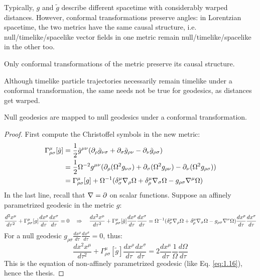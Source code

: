 Typically, $ g $ and $ \tilde{g} $ describe different spacetime with considerably warped distances. However, conformal transformations preserve angles: in Lorentzian spacetime, the two metrics have the same causal structure, i.e. null/timelike/spacelike vector fields in one metric remain null/timelike/spacelike in the other too.

\begin{proposition}
  Only conformal transformations of the metric preserve its causal structure.
\end{proposition}

Although timelike particle trajectories necessarily remain timelike under a conformal transformation, the same needs not be true for geodesics, as distances get warped.

\begin{proposition}
  Null geodesics are mapped to null geodesics under a conformal transformation.
\end{proposition}
\begin{proof}
  First compute the Christoffel symbols in the new metric:
  \begin{equation*}
    \begin{split}
      \Gamma^\mu_{\rho \sigma}[\tilde{g}]
      &= \frac{1}{2} \tilde{g}^{\mu \nu} (\partial_\rho \tilde{g}_{\nu \sigma} + \partial_\sigma \tilde{g}_{\rho \nu} - \partial_\nu \tilde{g}_{\rho \sigma}) \\
      &= \frac{1}{2} \Omega^{-2} g^{\mu \nu} (\partial_\rho (\Omega^2 g_{\nu \sigma}) + \partial_\sigma (\Omega^2 g_{\rho \nu}) - \partial_\nu (\Omega^2 g_{\rho \sigma})) \\
      &= \Gamma^\mu_{\rho \sigma}[g] + \Omega^{-1} (\delta^\mu_\sigma \nabla_\rho \Omega + \delta^\mu_\rho \nabla_\sigma \Omega - g_{\rho \sigma} \nabla^\mu \Omega)
    \end{split}
  \end{equation*}
  In the last line, recall that $ \nabla = \partial $ on scalar functions. Suppose an affinely parametrized geodesic in the metric $ g $:
  \begin{equation*}
    \frac{d^2 x^\mu}{d\tau^2} + \Gamma^\mu_{\rho \sigma}[g] \frac{dx^\rho}{d\tau} \frac{dx^\sigma}{d\tau} = 0
    \quad \Rightarrow \quad
    \frac{dx^2 x^\mu}{d\tau^2} + \Gamma^\mu_{\rho \sigma}[\tilde{g}] \frac{dx^\rho}{d\tau} \frac{dx^\sigma}{d\tau} = \Omega^{-1} (\delta^\mu_\sigma \nabla_\rho \Omega + \delta^\mu_\rho \nabla_\sigma \Omega - g_{\rho \sigma} \nabla^\nu \Omega) \frac{dx^\rho}{d\tau} \frac{dx^\sigma}{d\tau}
  \end{equation*}
  For a null geodesic $ g_{\rho \sigma} \frac{dx^\rho}{d\tau} \frac{dx^\sigma}{d\tau} = 0 $, thus:
  \begin{equation*}
    \frac{dx^2 x^\mu}{d\tau^2} + \Gamma^\mu_{\rho \sigma}[\tilde{g}] \frac{dx^\rho}{d\tau} \frac{dx^\sigma}{d\tau} = 2 \frac{dx^\mu}{d\tau} \frac{1}{\Omega} \frac{d\Omega}{d\tau}
  \end{equation*}
  This is the equation of non-affinely parametrized geodesic (like Eq. \ref{eq:1.16}), hence the thesis.
\end{proof}

